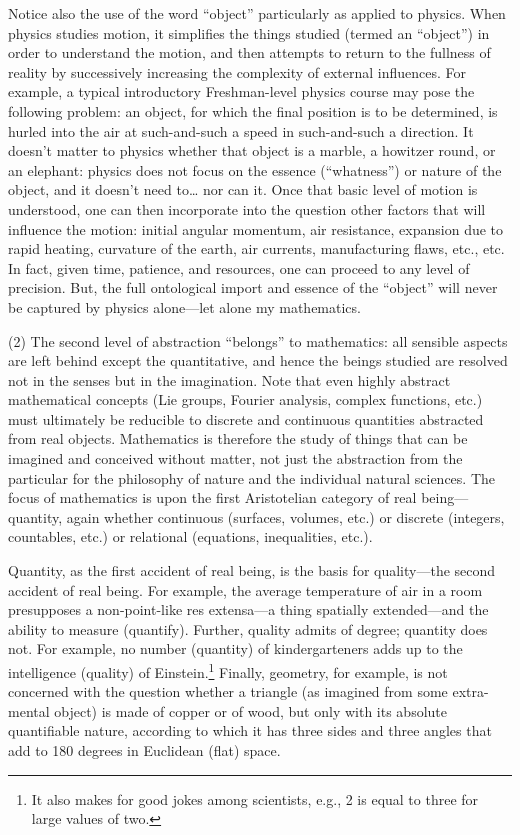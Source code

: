 Notice also the use of the word “object” particularly as applied to physics. When physics studies motion, it simplifies the things studied (termed an “object”) in order to understand the motion, and then attempts to return to the fullness of reality by successively increasing the complexity of external influences. For example, a typical introductory Freshman-level physics course may pose the following problem: an object, for which the final position is to be determined, is hurled into the air at such-and-such a speed in such-and-such a direction. It doesn’t matter to physics whether that object is a marble, a howitzer round, or an elephant: physics does not focus on the essence (“whatness”) or nature of the object, and it doesn’t need to… nor can it. Once that basic level of motion is understood, one can then incorporate into the question other factors that will influence the motion: initial angular momentum, air resistance, expansion due to rapid heating, curvature of the earth, air currents, manufacturing flaws, etc., etc. In fact, given time, patience, and resources, one can proceed to any level of precision. But, the full ontological import and essence of the “object” will never be captured by physics alone—let alone my mathematics.

(2) The second level of abstraction “belongs” to mathematics: all sensible aspects are left behind except the quantitative, and hence the beings studied are resolved not in the senses but in the imagination. Note that even highly abstract mathematical concepts (Lie groups, Fourier analysis, complex functions, etc.) must ultimately be reducible to discrete and continuous quantities abstracted from real objects. Mathematics is therefore the study of things that can be imagined and conceived without matter, not just the abstraction from the particular for the philosophy of nature and the individual natural sciences. The focus of mathematics is upon the first Aristotelian category of real being—quantity, again whether continuous (surfaces, volumes, etc.) or discrete (integers, countables, etc.) or relational (equations, inequalities, etc.).

Quantity, as the first accident of real being, is the basis for quality—the second accident of real being. For example, the average temperature of air in a room presupposes a non-point-like res extensa—a thing spatially extended—and the ability to measure (quantify). Further, quality admits of degree; quantity does not. For example, no number (quantity) of kindergarteners adds up to the intelligence (quality) of Einstein.\footnote{It also makes for good jokes among scientists, e.g., 2 is equal to three for large values of two.} Finally, geometry, for example, is not concerned with the question whether a triangle (as imagined from some extra-mental object) is made of copper or of wood, but only with its absolute quantifiable nature, according to which it has three sides and three angles that add to 180 degrees in Euclidean (flat) space.

